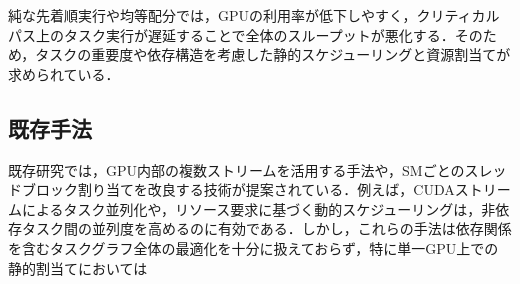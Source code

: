 純な先着順実行や均等配分では，GPUの利用率が低下しやすく，クリティカルパス上のタスク実行が遅延することで全体のスループットが悪化する．そのため，タスクの重要度や依存構造を考慮した静的スケジューリングと資源割当てが求められている．\subsection{既存手法}既存研究では，GPU内部の複数ストリームを活用する手法や，SMごとのスレッドブロック割り当てを改良する技術が提案されている．例えば，CUDAストリームによるタスク並列化や，リソース要求に基づく動的スケジューリングは，非依存タスク間の並列度を高めるのに有効である．しかし，これらの手法は依存関係を含むタスクグラフ全体の最適化を十分に扱えておらず，特に単一GPU上での静的割当てにおいては